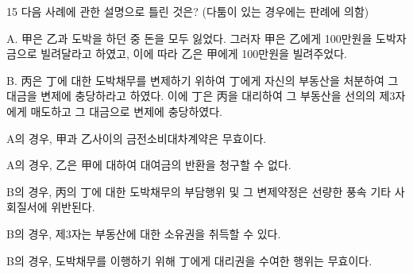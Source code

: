 \begin{question}{15}
다음 사례에 관한 설명으로 틀린 것은? (다툼이 있는 경우에는 판례에 의함)
\begin{framedtext}
A. 甲은 乙과 도박을 하던 중 돈을 모두 잃었다. 그러자 甲은 乙에게 100만원을 도박자금으로 빌려달라고 하였고, 이에 따라 乙은 甲에게 100만원을 빌려주었다.\par
B. 丙은 丁에 대한 도박채무를 변제하기 위하여 丁에게 자신의 부동산을 처분하여 그 대금을 변제에 충당하라고 하였다. 이에 丁은 丙을 대리하여 그 부동산을 선의의 제3자에게 매도하고 그 대금으로 변제에 충당하였다.
\end{framedtext}
\begin{choices}
  \item A의 경우, 甲과 乙사이의 금전소비대차계약은 무효이다.
  \item A의 경우, 乙은 甲에 대하여 대여금의 반환을 청구할 수 없다.
  \item B의 경우, 丙의 丁에 대한 도박채무의 부담행위 및 그 변제약정은 선량한 풍속 기타 사회질서에 위반된다.
  \item B의 경우, 제3자는 부동산에 대한 소유권을 취득할 수 있다.
  \item B의 경우, 도박채무를 이행하기 위해 丁에게 대리권을 수여한 행위는 무효이다.
\end{choices}
\end{question}
